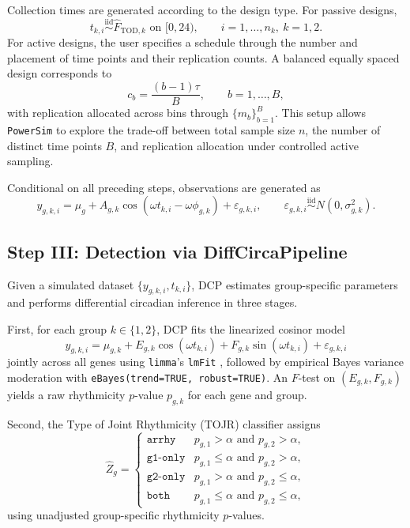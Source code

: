 \documentclass{article}
\newcommand{\software}[1]{\texttt{#1}}
\begin{document}
Collection times are generated according to the design type. For passive
designs,
\begin{equation}
t_{k,i}\overset{\mathrm{iid}}{\sim}\hat{F}_{\mathrm{TOD},k}
\text{ on }[0,24),
\qquad i=1,\ldots,n_k,\ k=1,2.
\label{eq:passive_times}
\end{equation}
For active designs, the user specifies a schedule through the number and
placement of time points and their replication counts. A balanced equally
spaced design corresponds to
\begin{equation}
c_b = \frac{(b-1)\tau}{B},\qquad b=1,\ldots,B,
\label{eq:active_bins}
\end{equation}
with replication allocated across bins through $\{m_b\}_{b=1}^B$.
This setup allows \software{PowerSim} to explore the trade-off between total
sample size $n$, the number of distinct time points $B$, and replication
allocation under controlled active sampling.

Conditional on all preceding steps, observations are generated as
\begin{equation}
y_{g,k,i}
=
\mu_g
+
A_{g,k}\cos(\omega t_{k,i}-\omega\phi_{g,k})
+
\varepsilon_{g,k,i},
\qquad
\varepsilon_{g,k,i}\overset{\mathrm{iid}}{\sim}N(0,\sigma_{g,k}^2).
\label{eq:obs}
\end{equation}

\subsection{Step III: Detection via DiffCircaPipeline}
\label{sec:dcp}

Given a simulated dataset $\{y_{g,k,i},t_{k,i}\}$, DCP estimates
group-specific parameters and performs differential circadian inference in
three stages.

First, for each group $k\in\{1,2\}$, DCP fits the linearized cosinor model
\[
y_{g,k,i}
=
\mu_{g,k}
+
E_{g,k}\cos(\omega t_{k,i})
+
F_{g,k}\sin(\omega t_{k,i})
+
\varepsilon_{g,k,i}
\]
jointly across all genes using \software{limma}'s \texttt{lmFit}
\cite{smyth2004linear}, followed by empirical Bayes variance moderation with
\texttt{eBayes(trend=TRUE, robust=TRUE)}. An $F$-test on
$(E_{g,k},F_{g,k})$ yields a raw rhythmicity $p$-value $p_{g,k}$ for each
gene and group.

Second, the Type of Joint Rhythmicity (TOJR) classifier assigns
\begin{equation}
\hat{Z}_g =
\begin{cases}
\texttt{arrhy} & p_{g,1}>\alpha \text{ and } p_{g,2}>\alpha,\\
\texttt{g1-only} & p_{g,1}\leq\alpha \text{ and } p_{g,2}>\alpha,\\
\texttt{g2-only} & p_{g,1}>\alpha \text{ and } p_{g,2}\leq\alpha,\\
\texttt{both} & p_{g,1}\leq\alpha \text{ and } p_{g,2}\leq\alpha,
\end{cases}
\label{eq:tojr}
\end{equation}
using unadjusted group-specific rhythmicity $p$-values.
\end{document}
